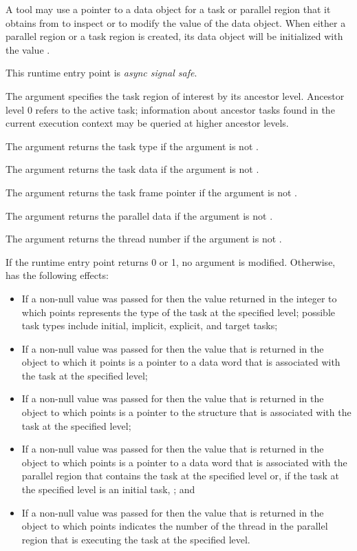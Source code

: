 A tool may use a pointer to a data object for a task or parallel region 
that it obtains from  to inspect or to modify the
value of the data object. When either a parallel region or a task region 
is created, its data object will be initialized with the value .

This runtime entry point is \emph{async signal safe}.

\argdesc
The  argument specifies the task region of interest by 
its ancestor level. Ancestor level 0 refers to the active task; information 
about ancestor tasks found in the current execution context may be queried 
at higher ancestor levels.

The  argument returns the task type if the argument is not .

The  argument returns the task data if the argument is not .

The  argument returns the task frame pointer
if the argument is not .

The  argument returns the parallel data
if the argument is not .

The  argument returns the thread number
if the argument is not .

\effect
If the runtime entry point returns 0 or 1, no argument is modified.
Otherwise,  has the following effects:

\begin{itemize}
\item If a non-null value was passed for  then the value 
      returned in the integer to which  points represents 
      the type of the task at the specified level; possible task types 
      include initial, implicit, explicit, and target tasks;
\item If a non-null value was passed for  then the value that
      is returned in the object to which it points is a pointer to a data word
      that is associated with the task at the specified level;
\item If a non-null value was passed for  then the value that
      is returned in the object to which  points is a pointer 
      to the  structure that is associated with the task at 
      the specified level;
\item If a non-null value was passed for  then the value that
      is returned in the object to which  points is a pointer 
      to a data word that is associated with the parallel region that contains 
      the task at the specified level or, if the task at the specified level is 
      an initial task, ; and
\item If a non-null value was passed for  then the value that 
      is returned in the object to which  points indicates the 
      number of the thread in the parallel region that is executing the task
      at the specified level.
\end{itemize}

